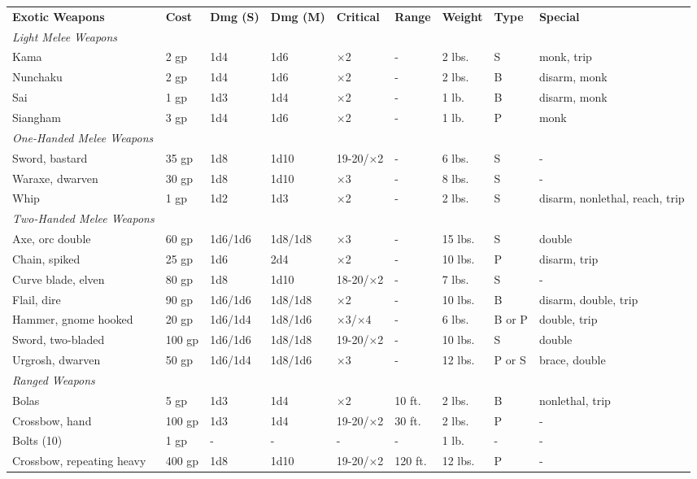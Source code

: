 \begin{table*}
\begin{tabular}{lllllllll}
\textbf{Exotic Weapons} & \textbf{Cost} & \textbf{Dmg (S)} & \textbf{Dmg (M)} & \textbf{Critical} & \textbf{Range} & \textbf{Weight} & \textbf{Type} & \textbf{Special}\\
\textit{Light Melee Weapons} \\
 Kama & 2 gp & 1d4 & 1d6 & $\times$2 & - & 2 lbs. & S &  monk, trip \\
 Nunchaku & 2 gp & 1d4 & 1d6 & $\times$2 & - & 2 lbs. & B & disarm, monk \\
 Sai & 1 gp & 1d3 & 1d4 & $\times$2 & - & 1 lb. & B & disarm, monk \\
 Siangham & 3 gp & 1d4 & 1d6 & $\times$2 & - & 1 lb. & P & monk \\
\textit{One-Handed Melee Weapons} \\
 Sword, bastard & 35 gp & 1d8 & 1d10 & 19-20/$\times$2 & - & 6 lbs. & S & - \\
 Waraxe, dwarven & 30 gp & 1d8 & 1d10 & $\times$3 & - & 8 lbs. & S & - \\
 Whip & 1 gp & 1d2 & 1d3 & $\times$2 & - & 2 lbs. & S & disarm, nonlethal, reach, trip \\
 \textit{Two-Handed Melee Weapons} \\
 Axe, orc double & 60 gp & 1d6/1d6 & 1d8/1d8 & $\times$3 & - & 15 lbs. & S & double \\
 Chain, spiked & 25 gp & 1d6 & 2d4 & $\times$2 & - & 10 lbs. & P & disarm, trip \\
 Curve blade, elven & 80 gp & 1d8 & 1d10 & 18-20/$\times$2 & - & 7 lbs. & S & - \\
 Flail, dire & 90 gp & 1d6/1d6 & 1d8/1d8 & $\times$2 & - & 10 lbs. & B & disarm, double, trip \\
 Hammer, gnome hooked & 20 gp & 1d6/1d4 & 1d8/1d6 & $\times$3/$\times$4 & - & 6 lbs. & B or P & double, trip \\
 Sword, two-bladed & 100 gp & 1d6/1d6 & 1d8/1d8 & 19-20/$\times$2 & - & 10 lbs. & S & double \\
 Urgrosh, dwarven & 50 gp & 1d6/1d4 & 1d8/1d6 & $\times$3 & - & 12 lbs. & P or S & brace, double \\
 \textit{Ranged Weapons} \\
 Bolas & 5 gp & 1d3 & 1d4 & $\times$2 & 10 ft. & 2 lbs. & B & nonlethal, trip \\
 Crossbow, hand & 100 gp & 1d3 & 1d4 & 19-20/$\times$2 & 30 ft. & 2 lbs. & P & - \\
 Bolts (10) & 1 gp & - & - & - & - & 1 lb. & - & - \\
 Crossbow, repeating heavy & 400 gp & 1d8 & 1d10 & 19-20/$\times$2 & 120 ft. & 12 lbs. & P & - \\

\end{tabular}
\end{table*}
